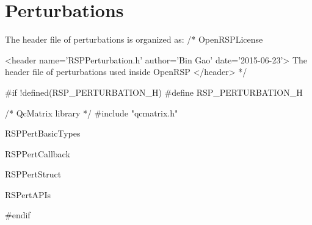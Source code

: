 \nwendcode{}\section{Perturbations}
\label{section-OpenRSP-perturbations}

The header file of perturbations is organized as:
\nwenddocs{}\endmoddef
/*
  \LA{}OpenRSPLicense~{\nwtagstyle{}}\RA{}

  <header name='RSPPerturbation.h' author='Bin Gao' date='2015-06-23'>
    The header file of perturbations used inside OpenRSP
  </header>
*/

#if !defined(RSP_PERTURBATION_H)
#define RSP_PERTURBATION_H

/* QcMatrix library */
#include "qcmatrix.h"

\LA{}RSPPertBasicTypes~{\nwtagstyle{}}\RA{}

\LA{}RSPPertCallback~{\nwtagstyle{}}\RA{}

\LA{}RSPPertStruct~{\nwtagstyle{}}\RA{}

\LA{}RSPertAPIs~{\nwtagstyle{}}\RA{}

#endif
\nwendcode{}\nwdocspar

